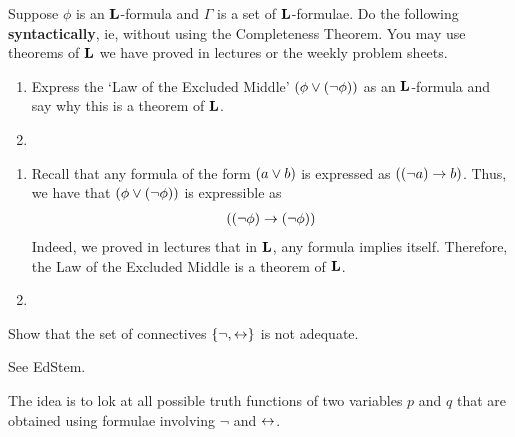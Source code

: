\begin{boxproblem}
    Suppose $\phi$ is an $\mathbf{L}$-formula and $\Gamma$ is a set of $\mathbf{L}$-formulae. Do the following \textbf{syntactically}, ie, without using the Completeness Theorem. You may use theorems of $\mathbf{L}$ we have proved in lectures or the weekly problem sheets.
    \begin{enumerate}[label = \normalfont (\roman*)]
        \item Express the `Law of the Excluded Middle' $\left( \phi \lor \left( \neg \phi \right) \right)$ as an $\mathbf{L}$-formula and say why this is a theorem of $\mathbf{L}$.
        
        \item \sorry
    \end{enumerate}
\end{boxproblem}
\begin{solution}\hfill
    \begin{enumerate}[label = (\roman*)]
        \item Recall that any formula of the form $\left( a \lor b \right)$ is expressed as $\left( \left( \neg a \right) \to b \right)$. Thus, we have that $\left( \phi \lor \left( \neg \phi \right) \right)$ is expressible as
        \begin{align*}
            \left( \left( \neg {\phi} \right) \to \left( \neg \phi \right) \right)
        \end{align*}
        Indeed, we proved in lectures that in $\mathbf{L}$, any formula implies itself. Therefore, the Law of the Excluded Middle is a theorem of $\mathbf{L}$.

        \item \sorry
    \end{enumerate}    
\end{solution}

\begin{boxproblem}
    Show that the set of connectives $\left\{ \neg, \leftrightarrow \right\}$ is not adequate.
    \begin{hint}
        See EdStem.
    \end{hint}
\end{boxproblem}
\begin{solution}
    The idea is to lok at all possible truth functions of two variables $p$ and $q$ that are obtained using formulae involving $\neg$ and $\leftrightarrow$.
    \sorry
\end{solution}
